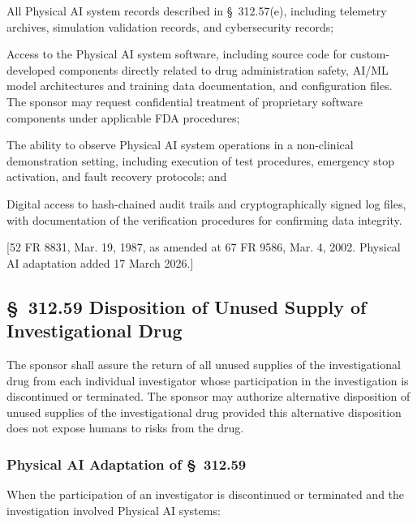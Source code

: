 \begin{description}[leftmargin=0.8cm,style=sameline]
\item[(i)] All Physical AI system records described in \S~312.57(e), including telemetry archives, simulation validation records, and cybersecurity records;
\item[(ii)] Access to the Physical AI system software, including source code for custom-developed components directly related to drug administration safety, AI/ML model architectures and training data documentation, and configuration files. The sponsor may request confidential treatment of proprietary software components under applicable FDA procedures;
\item[(iii)] The ability to observe Physical AI system operations in a non-clinical demonstration setting, including execution of test procedures, emergency stop activation, and fault recovery protocols; and
\item[(iv)] Digital access to hash-chained audit trails and cryptographically signed log files, with documentation of the verification procedures for confirming data integrity.
\end{description}

[52 FR 8831, Mar. 19, 1987, as amended at 67 FR 9586, Mar. 4, 2002. Physical AI adaptation added 17 March 2026.]

\subsection{\S~312.59 Disposition of Unused Supply of Investigational Drug}

The sponsor shall assure the return of all unused supplies of the investigational drug from each individual investigator whose participation in the investigation is discontinued or terminated. The sponsor may authorize alternative disposition of unused supplies of the investigational drug provided this alternative disposition does not expose humans to risks from the drug.

\subsubsection{Physical AI Adaptation of \S~312.59}

When the participation of an investigator is discontinued or terminated and the investigation involved Physical AI systems:

